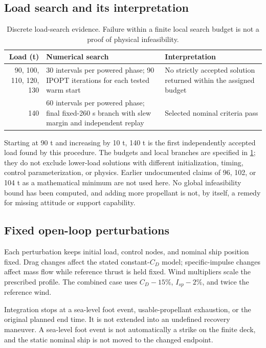 \documentclass[11pt,a4paper]{article}
\begin{document}
\subsection{Load search and its interpretation}
\begin{table}[htbp]
\caption{Discrete load-search evidence. Failure within a finite local search budget is not a proof of physical infeasibility.}
\label{tab:loadsearch}
\small
\begin{tabularx}{\linewidth}{@{}rXX@{}}
\toprule
Load (t) & Numerical search & Interpretation\\
\midrule
90, 100, 110, 120, 130 & 30 intervals per powered phase; 90 IPOPT iterations for each tested warm start & No strictly accepted solution returned within the assigned budget\\
140 & 60 intervals per powered phase; final fixed-260 s branch with slew margin and independent replay & Selected nominal criteria pass\\
\bottomrule
\end{tabularx}
\end{table}

Starting at 90 t and increasing by 10 t, 140 t is the first independently accepted load found by this procedure. The budgets and local branches are specified in \cref{tab:loadsearch}; they do not exclude lower-load solutions with different initialization, timing, control parameterization, or physics. Earlier undocumented claims of 96, 102, or 104 t as a mathematical minimum are not used here. No global infeasibility bound has been computed, and adding more propellant is not, by itself, a remedy for missing attitude or support capability.

\subsection{Fixed open-loop perturbations}
Each perturbation keeps initial load, control nodes, and nominal ship position fixed. Drag changes affect the stated constant-$C_D$ model; specific-impulse changes affect mass flow while reference thrust is held fixed. Wind multipliers scale the prescribed profile. The combined case uses $C_D-15\%$, $I_{sp}-2\%$, and twice the reference wind.

Integration stops at a sea-level foot event, usable-propellant exhaustion, or the original planned end time. It is not extended into an undefined recovery maneuver. A sea-level foot event is not automatically a strike on the finite deck, and the static nominal ship is not moved to the changed endpoint.
\end{document}
